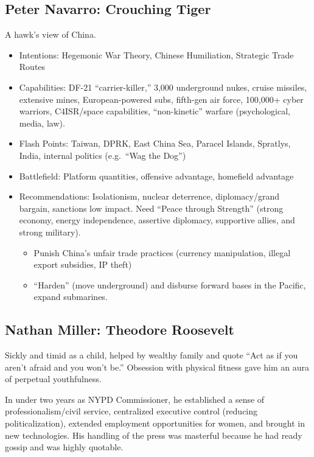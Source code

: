 \documentclass[
]{article}
\begin{document}
\hypertarget{peter-navarro-crouching-tiger}{%
\subsection{Peter Navarro: Crouching
Tiger}\label{peter-navarro-crouching-tiger}}

A hawk's view of China.

\begin{itemize}
\item
  Intentions: Hegemonic War Theory, Chinese Humiliation, Strategic Trade
  Routes
\item
  Capabilities: DF-21 ``carrier-killer,'' 3,000 underground nukes,
  cruise missiles, extensive mines, European-powered subs, fifth-gen air
  force, 100,000+ cyber warriors, C4ISR/space capabilities,
  ``non-kinetic'' warfare (psychological, media, law).
\item
  Flash Points: Taiwan, DPRK, East China Sea, Paracel Islands, Spratlys,
  India, internal politics (e.g.~``Wag the Dog'')
\item
  Battlefield: Platform quantities, offensive advantage, homefield
  advantage
\item
  Recommendations: Isolationism, nuclear deterrence, diplomacy/grand
  bargain, sanctions low impact. Need ``Peace through Strength'' (strong
  economy, energy independence, assertive diplomacy, supportive allies,
  and strong military).

  \begin{itemize}
  \item
    Punish China's unfair trade practices (currency manipulation,
    illegal export subsidies, IP theft)
  \item
    ``Harden'' (move underground) and disburse forward bases in the
    Pacific, expand submarines.
  \end{itemize}
\end{itemize}

\hypertarget{nathan-miller-theodore-roosevelt}{%
\subsection{Nathan Miller: Theodore
Roosevelt}\label{nathan-miller-theodore-roosevelt}}

Sickly and timid as a child, helped by wealthy family and quote ``Act as
if you aren't afraid and you won't be.'' Obsession with physical fitness
gave him an aura of perpetual youthfulness.

In under two years as NYPD Commissioner, he established a sense of
professionalism/civil service, centralized executive control (reducing
politicalization), extended employment opportunities for women, and
brought in new technologies. His handling of the press was masterful
because he had ready gossip and was highly quotable.
\end{document}
